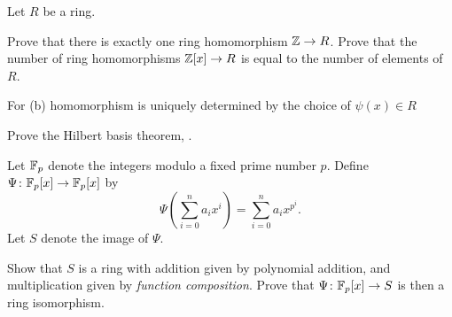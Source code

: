 \begin{problem}
	Let $R$ be a ring.
	\begin{enumerate}[(a)]
		\ii Prove that there is exactly one ring homomorphism $\mathbb Z \to R$.
		\ii Prove that the number of ring homomorphisms
		$\mathbb Z[x] \to R$ is equal to the number of elements of $R$.
	\end{enumerate}
	\begin{hint}
		For (b) homomorphism is uniquely determined by the choice of $\psi(x) \in R$
	\end{hint}
\end{problem}


\begin{problem}
	\gim
	Prove the Hilbert basis theorem, .
\end{problem}

\begin{problem}
	Let $\mathbb F_p$ denote the integers modulo a fixed prime number $p$.
	Define $\Psi \colon \mathbb F_p[x] \to \mathbb F_p[x]$ by
	\[ \Psi\left( \sum_{i=0}^n a_i x^i \right) = \sum_{i=0}^n a_i x^{p^i}. \]
	Let $S$ denote the image of $\Psi$.
	\begin{enumerate}[(a)]
		\ii Show that $S$ is a ring with addition
		given by polynomial addition,
		and multiplication given by \emph{function composition}.
		\ii Prove that $\Psi \colon \mathbb F_p[x] \to S$
		is then a ring isomorphism.
	\end{enumerate}
\end{problem}

